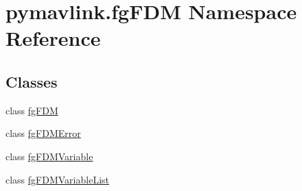 \hypertarget{namespacepymavlink_1_1fgFDM}{}\section{pymavlink.\+fg\+F\+DM Namespace Reference}
\label{namespacepymavlink_1_1fgFDM}
\subsection*{Classes}
\begin{DoxyCompactItemize}
\item 
class \mbox{\hyperlink{classpymavlink_1_1fgFDM_1_1fgFDM}{fg\+F\+DM}}
\item 
class \mbox{\hyperlink{classpymavlink_1_1fgFDM_1_1fgFDMError}{fg\+F\+D\+M\+Error}}
\item 
class \mbox{\hyperlink{classpymavlink_1_1fgFDM_1_1fgFDMVariable}{fg\+F\+D\+M\+Variable}}
\item 
class \mbox{\hyperlink{classpymavlink_1_1fgFDM_1_1fgFDMVariableList}{fg\+F\+D\+M\+Variable\+List}}
\end{DoxyCompactItemize}
